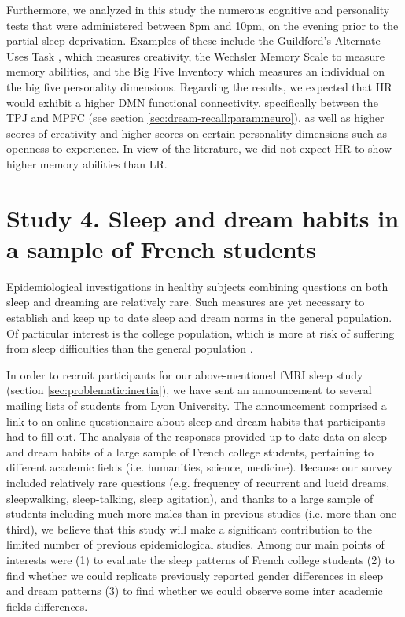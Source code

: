 Furthermore, we analyzed in this study the numerous cognitive and personality tests that were administered between 8pm and 10pm, on the evening prior to the partial sleep deprivation. Examples of these include the Guildford's Alternate Uses Task \citep{guildford_alternate_1978}, which measures creativity, the Wechsler Memory Scale \citep{wechsler_mem-iii:_2001} to measure memory abilities, and the Big Five Inventory \citep{john_big_1999} which measures an individual on the big five personality dimensions. Regarding the results, we expected that HR would exhibit a higher DMN functional connectivity, specifically between the TPJ and MPFC (see section \ref{sec:dream-recall:param:neuro}), as well as higher scores of creativity and higher scores on certain personality dimensions such as openness to experience. In view of the literature, we did not expect HR to show higher memory abilities than LR.

\FloatBarrier

\section{Study 4. Sleep and dream habits in a sample of French students}
\label{sec:problematic:survey}

Epidemiological investigations in healthy subjects combining questions on both sleep and dreaming are relatively rare. Such measures are yet necessary to establish and keep up to date sleep and dream norms in the general population. Of particular interest is the college population, which is more at risk of suffering from sleep difficulties than the general population \citep{buboltz_sleep_2001, curcio_sleep_2006, forquer_sleep_2008, lund_sleep_2010}.

In order to recruit participants for our above-mentioned fMRI sleep study (section \ref{sec:problematic:inertia}), we have sent an announcement to several mailing lists of students from Lyon University. The announcement comprised a link to an online questionnaire about sleep and dream habits that participants had to fill out. The analysis of the responses provided up-to-date data on sleep and dream habits of a large sample of French college students, pertaining to different academic fields (i.e. humanities, science, medicine). Because our survey included relatively rare questions (e.g. frequency of recurrent and lucid dreams, sleepwalking, sleep-talking, sleep agitation), and thanks to a large sample of students including much more males than in previous studies (i.e. more than one third), we believe that this study will make a significant contribution to the limited number of previous epidemiological studies. Among our main points of interests were (1) to evaluate the sleep patterns of French college students (2) to find whether we could replicate previously reported gender differences in sleep and dream patterns (3) to find whether we could observe some inter academic fields differences.

